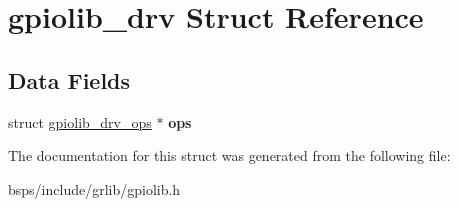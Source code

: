 \hypertarget{structgpiolib__drv}{}\section{gpiolib\+\_\+drv Struct Reference}
\label{structgpiolib__drv}
\subsection*{Data Fields}
\begin{DoxyCompactItemize}
\item 
\mbox{\label{structgpiolib__drv_aa300ce8b58f95964d6174d15482fd166}} 
struct \mbox{\hyperlink{structgpiolib__drv__ops}{gpiolib\+\_\+drv\+\_\+ops}} $\ast$ {\bfseries ops}
\end{DoxyCompactItemize}


The documentation for this struct was generated from the following file\+:\begin{DoxyCompactItemize}
\item 
bsps/include/grlib/gpiolib.\+h\end{DoxyCompactItemize}
